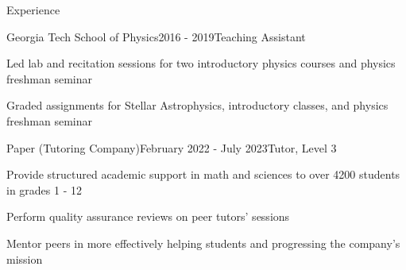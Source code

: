 \documentclass{resume} %
\begin{document}
\begin{rSection}{Experience}

  \begin{rSubsection}{Georgia Tech School of Physics}{2016 - 2019}{Teaching Assistant}{}
  \item Led lab and recitation sessions for two introductory physics courses and physics freshman seminar
  \item Graded assignments for Stellar Astrophysics, introductory classes, and physics freshman seminar
  \end{rSubsection}

  \begin{rSubsection}{Paper (Tutoring Company)}{February 2022 - July 2023}{Tutor, Level 3}{}
  \item Provide structured academic support in math and sciences to over 4200 students in grades 1 - 12
  \item Perform quality assurance reviews on peer tutors' sessions
  \item Mentor peers in more effectively helping students and progressing the company's mission
  \end{rSubsection}




\end{rSection}
\end{document}
